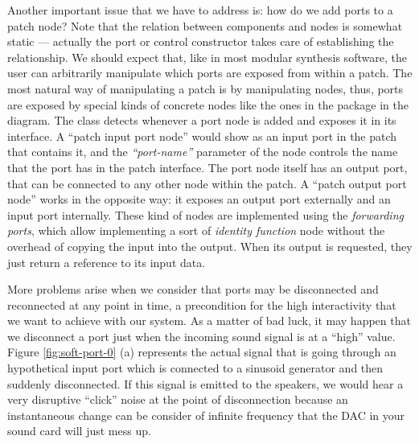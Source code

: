 Another important issue that we have to address is: how do we add
ports to a patch node? Note that the relation between components and
nodes is somewhat static --- actually the port or control constructor
takes care of establishing the relationship. We should expect that,
like in most modular synthesis software, the user can arbitrarily
manipulate which ports are exposed from within a patch. The most
natural way of manipulating a patch is by manipulating nodes, thus,
ports are exposed by special kinds of concrete nodes like the ones in
the  package in the diagram. The  class detects
whenever a port node is added and exposes it in its interface. A
``patch input port node'' would show as an input port in the patch
that contains it, and the \emph{``port-name''} parameter of the node
controls the name that the port has in the patch interface. The port
node itself has an output port, that can be connected to any other
node within the patch. A ``patch output port node'' works in the
opposite way: it exposes an output port externally and an input port
internally. These kind of nodes are implemented using the
\emph{forwarding ports}, which allow
implementing a sort of \emph{identity function} node without the
overhead of copying the input into the output. When its output is
requested, they just return a reference to its input data.

More problems arise when we consider that ports may be disconnected
and reconnected at any point in time, a precondition for the high
interactivity that we want to achieve with our system. As a matter of
bad luck, it may happen that we disconnect a port just when the
incoming sound signal is at a ``high'' value. Figure
\ref{fig:soft-port-0} (a) represents the actual signal that is going
through an hypothetical input port which is connected to a sinusoid
generator and then suddenly disconnected. If this signal is emitted to
the speakers, we would hear a very disruptive ``click'' noise at the
point of disconnection because an instantaneous change can be consider
of infinite frequency that the DAC in your sound card will just mess
up.

